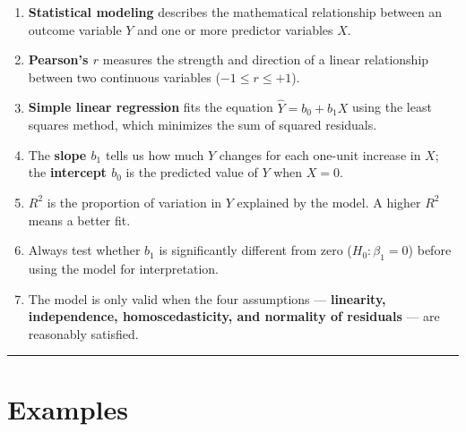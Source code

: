 \documentclass[
  12pt,
  letterpaper,
]{book}
\begin{document}
\begin{tcolorbox}[enhanced jigsaw, arc=.35mm, bottomrule=.15mm, bottomtitle=1mm, breakable, colback=white, colbacktitle=quarto-callout-note-color!10!white, colframe=quarto-callout-note-color-frame, coltitle=black, left=2mm, leftrule=.75mm, opacityback=0, opacitybacktitle=0.6, rightrule=.15mm, title={📝 Chapter 6 Summary}, titlerule=0mm, toprule=.15mm, toptitle=1mm]

\begin{enumerate}
\def\labelenumi{\arabic{enumi}.}
\item
  \textbf{Statistical modeling} describes the mathematical relationship
  between an outcome variable \(Y\) and one or more predictor variables
  \(X\).
\item
  \textbf{Pearson's \(r\)} measures the strength and direction of a
  linear relationship between two continuous variables
  (\(-1 \leq r \leq +1\)).
\item
  \textbf{Simple linear regression} fits the equation
  \(\hat{Y} = b_0 + b_1 X\) using the least squares method, which
  minimizes the sum of squared residuals.
\item
  The \textbf{slope \(b_1\)} tells us how much \(Y\) changes for each
  one-unit increase in \(X\); the \textbf{intercept \(b_0\)} is the
  predicted value of \(Y\) when \(X = 0\).
\item
  \textbf{\(R^2\)} is the proportion of variation in \(Y\) explained by
  the model. A higher \(R^2\) means a better fit.
\item
  Always test whether \(b_1\) is significantly different from zero
  (\(H_0: \beta_1 = 0\)) before using the model for interpretation.
\item
  The model is only valid when the four assumptions ---
  \textbf{linearity, independence, homoscedasticity, and normality of
  residuals} --- are reasonably satisfied.
\end{enumerate}

\end{tcolorbox}

\begin{center}\rule{0.5\linewidth}{0.5pt}\end{center}


\chapter{Examples}\label{examples-5}
\end{document}
